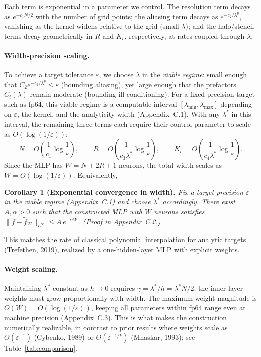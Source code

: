 \documentclass{article}
\begin{document}
Each term is exponential in a parameter we control. The resolution term decays as \(e^{-c_1 N/2}\) with the number of grid points; the aliasing term decays as \(e^{-c_2/\lambda^p}\), vanishing as the kernel widens relative to the grid (small \(\lambda\)); and the halo/stencil terms decay geometrically in \(R\) and \(K_c\), respectively, at rates coupled through \(\lambda\).

\paragraph{Width-precision scaling.}
To achieve a target tolerance \(\varepsilon\), we choose \(\lambda\) in the \emph{viable regime}: small enough that \(C_2 e^{-c_2/\lambda^p} \leq \varepsilon\) (bounding aliasing), yet large enough that the prefactors \(C_i(\lambda)\) remain moderate (bounding ill-conditioning). For a fixed precision target such as fp64, this viable regime is a computable interval \([\lambda_{\min}, \lambda_{\max}]\) depending on \(\varepsilon\), the kernel, and the analyticity width (Appendix~C.1). With any \(\lambda^*\) in this interval, the remaining three terms each require their control parameter to scale as \(O(\log(1/\varepsilon))\):
\[
N = O\!\left(\frac{1}{c_1}\log\frac{1}{\varepsilon}\right),
\qquad
R = O\!\left(\frac{1}{c_3\lambda^*}\log\frac{1}{\varepsilon}\right),
\qquad
K_c = O\!\left(\frac{1}{c_4\lambda^*}\log\frac{1}{\varepsilon}\right).
\]
Since the MLP has \(W = N + 2R + 1\) neurons, the total width scales as \(W = O(\log(1/\varepsilon))\). Equivalently,

\medskip
\noindent\textbf{Corollary 1 (Exponential convergence in width).}
\emph{Fix a target precision \(\varepsilon\) in the viable regime (Appendix~C.1) and choose \(\lambda^*\) accordingly. There exist \(A, \alpha > 0\) such that the constructed MLP with \(W\) neurons satisfies \(\|f - \widetilde{f}_W\|_{L^\infty} \leq A\, e^{-\alpha W}\). (Proof in Appendix~C.2.)}

This matches the rate of classical polynomial interpolation for analytic targets (Trefethen, 2019), realized by a one-hidden-layer MLP with explicit weights.

\paragraph{Weight scaling.}
Maintaining \(\lambda^*\) constant as \(h \to 0\) requires \(\gamma = \lambda^*/h = \lambda^* N/2\): the inner-layer weights must grow proportionally with width. The maximum weight magnitude is \(O(W) = O(\log(1/\varepsilon))\), keeping all parameters within fp64 range even at machine precision (Appendix~C.3). This is what makes the construction numerically realizable, in contrast to prior results where weights scale as \(\Theta(\varepsilon^{-1})\) (Cybenko, 1989) or \(\Theta(\varepsilon^{-1/k})\) (Mhaskar, 1993); see Table~\ref{tab:comparison}.
\end{document}
